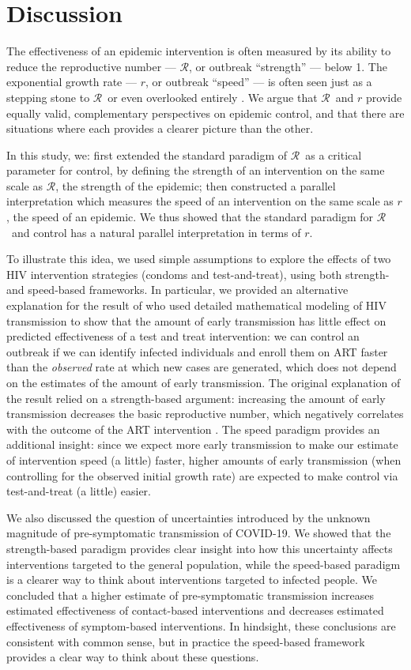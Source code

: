 \documentclass[12pt]{article}
\newcommand{\RR}{\ensuremath{{\mathcal R}}}
\begin{document}
\section{Discussion}

The effectiveness of an epidemic intervention is often measured by its ability to reduce the reproductive number --- \RR, or outbreak ``strength'' --- below 1. The exponential growth rate --- $r$, or outbreak ``speed'' --- is often seen just as a stepping stone to \RR\, or even overlooked entirely \citep{park2020reconciling}.
We argue that \RR\ and $r$ provide equally valid, complementary perspectives on epidemic control, and that there are situations where each provides a clearer picture than the other.

In this study, we:
first extended the standard paradigm of \RR\ as a critical parameter for control, by defining the strength of an intervention on the same scale as \RR, the strength of the epidemic; 
then constructed a parallel interpretation which measures the speed of an intervention on the same scale as $r$, the speed of an epidemic.
We thus showed that the standard paradigm for \RR\ and control has a natural parallel interpretation in terms of $r$.

To illustrate this idea, we used simple assumptions to explore the effects of two HIV intervention strategies (condoms and test-and-treat), using both strength- and speed-based frameworks.
In particular, we provided an alternative explanation for the result of \cite{eaton2014proportion} who used detailed mathematical modeling of HIV transmission to show that the amount of early transmission has little effect on predicted effectiveness of a test and treat intervention:
we can control an outbreak if we can identify infected individuals and enroll them on ART faster than the \emph{observed} rate at which new cases are generated, which does not depend on the estimates of the amount of early transmission.
The original explanation of the result relied on a strength-based argument: increasing the amount of early transmission decreases the basic reproductive number, which negatively correlates with the outcome of the ART intervention \citep{eaton2014proportion}.
The speed paradigm provides an additional insight: since we expect more early transmission to make our estimate of intervention speed (a little) faster, higher amounts of early transmission (when controlling for the observed initial growth rate) are expected to make control via test-and-treat (a little) easier.

We also discussed the question of uncertainties introduced by the unknown magnitude of pre-symptomatic transmission of COVID-19. We showed that the strength-based paradigm provides clear insight into how this uncertainty affects interventions targeted to the general population, while the speed-based paradigm is a clearer way to think about interventions targeted to infected people. We concluded that a higher estimate of pre-symptomatic transmission increases estimated effectiveness of contact-based interventions and decreases estimated effectiveness of symptom-based interventions. In hindsight, these conclusions are consistent with common sense, but in practice the speed-based framework provides a clear way to think about these questions.
\end{document}
